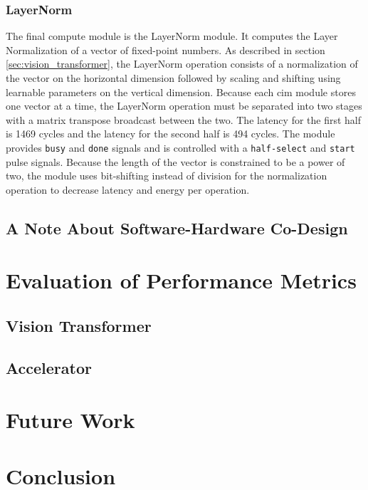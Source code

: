 \documentclass[12pt, hidelinks]{article}
\begin{document}
\subsubsection{LayerNorm}
The final compute module is the LayerNorm module. It computes the Layer Normalization of a vector of fixed-point numbers. As described in section \ref{sec:vision_transformer}, the LayerNorm operation consists of a normalization of
the vector on the horizontal dimension followed by scaling and shifting using learnable parameters on the vertical dimension. Because each \ac{cim} module stores one vector at a time, the LayerNorm operation must be separated into 
two stages with a matrix transpose broadcast between the two. The latency for the first half is 1469 cycles and the latency for the second half is 494 cycles. The module provides \texttt{busy} and \texttt{done} signals and is controlled
with a \texttt{half-select} and \texttt{start} pulse signals. Because the length of the vector is constrained to be a power of two, the module uses bit-shifting instead of division for the normalization operation to decrease latency and energy
per operation.

\subsection{A Note About Software-Hardware Co-Design}

\lipsum[1]

\newpage
\section{Evaluation of Performance Metrics}
\lipsum[1]
\subsection{Vision Transformer}
\lipsum[1]
\subsection{Accelerator}
\lipsum[1]

\newpage
\section{Future Work}
\lipsum[1]

\newpage
\section{Conclusion}
\lipsum[1]

\newpage

\printbibliography[heading=bibintoc]
\newpage





\newpage
\end{document}
